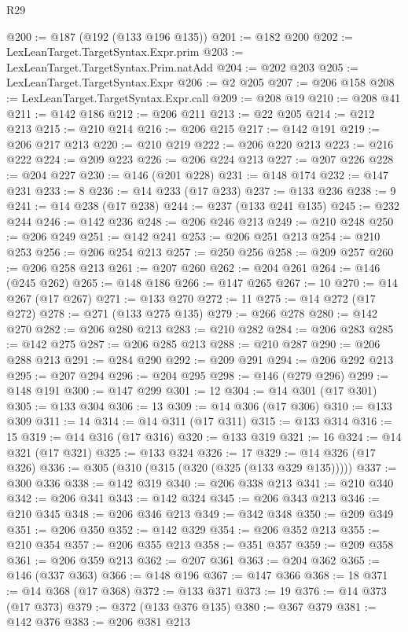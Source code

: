 \begin{lexlean}{R29}
\begin{coremodule}
@200 := @187 (@192 (@133 @196 @135))
@201 := @182 @200
@202 := LexLeanTarget.TargetSyntax.Expr.prim
@203 := LexLeanTarget.TargetSyntax.Prim.natAdd
@204 := @202 @203
@205 := LexLeanTarget.TargetSyntax.Expr
@206 := @2 @205
@207 := @206 @158
@208 := LexLeanTarget.TargetSyntax.Expr.call
@209 := @208 @19
@210 := @208 @41
@211 := @142 @186
@212 := @206 @211
@213 := @22 @205
@214 := @212 @213
@215 := @210 @214
@216 := @206 @215
@217 := @142 @191
@219 := @206 @217 @213
@220 := @210 @219
@222 := @206 @220 @213
@223 := @216 @222
@224 := @209 @223
@226 := @206 @224 @213
@227 := @207 @226
@228 := @204 @227
@230 := @146 (@201 @228)
@231 := @148 @174
@232 := @147 @231
@233 := 8
@236 := @14 @233 (@17 @233)
@237 := @133 @236
@238 := 9
@241 := @14 @238 (@17 @238)
@244 := @237 (@133 @241 @135)
@245 := @232 @244
@246 := @142 @236
@248 := @206 @246 @213
@249 := @210 @248
@250 := @206 @249
@251 := @142 @241
@253 := @206 @251 @213
@254 := @210 @253
@256 := @206 @254 @213
@257 := @250 @256
@258 := @209 @257
@260 := @206 @258 @213
@261 := @207 @260
@262 := @204 @261
@264 := @146 (@245 @262)
@265 := @148 @186
@266 := @147 @265
@267 := 10
@270 := @14 @267 (@17 @267)
@271 := @133 @270
@272 := 11
@275 := @14 @272 (@17 @272)
@278 := @271 (@133 @275 @135)
@279 := @266 @278
@280 := @142 @270
@282 := @206 @280 @213
@283 := @210 @282
@284 := @206 @283
@285 := @142 @275
@287 := @206 @285 @213
@288 := @210 @287
@290 := @206 @288 @213
@291 := @284 @290
@292 := @209 @291
@294 := @206 @292 @213
@295 := @207 @294
@296 := @204 @295
@298 := @146 (@279 @296)
@299 := @148 @191
@300 := @147 @299
@301 := 12
@304 := @14 @301 (@17 @301)
@305 := @133 @304
@306 := 13
@309 := @14 @306 (@17 @306)
@310 := @133 @309
@311 := 14
@314 := @14 @311 (@17 @311)
@315 := @133 @314
@316 := 15
@319 := @14 @316 (@17 @316)
@320 := @133 @319
@321 := 16
@324 := @14 @321 (@17 @321)
@325 := @133 @324
@326 := 17
@329 := @14 @326 (@17 @326)
@336 := @305 (@310 (@315 (@320 (@325 (@133 @329 @135)))))
@337 := @300 @336
@338 := @142 @319
@340 := @206 @338 @213
@341 := @210 @340
@342 := @206 @341
@343 := @142 @324
@345 := @206 @343 @213
@346 := @210 @345
@348 := @206 @346 @213
@349 := @342 @348
@350 := @209 @349
@351 := @206 @350
@352 := @142 @329
@354 := @206 @352 @213
@355 := @210 @354
@357 := @206 @355 @213
@358 := @351 @357
@359 := @209 @358
@361 := @206 @359 @213
@362 := @207 @361
@363 := @204 @362
@365 := @146 (@337 @363)
@366 := @148 @196
@367 := @147 @366
@368 := 18
@371 := @14 @368 (@17 @368)
@372 := @133 @371
@373 := 19
@376 := @14 @373 (@17 @373)
@379 := @372 (@133 @376 @135)
@380 := @367 @379
@381 := @142 @376
@383 := @206 @381 @213

\end{coremodule}
\end{lexlean}
